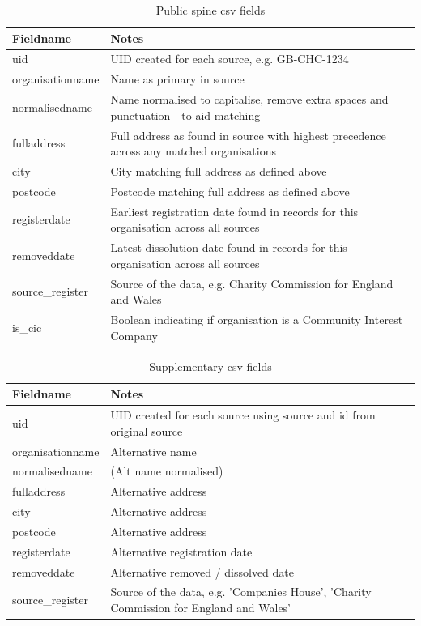 \documentclass{article}
\begin{document}
\begin{table}[h]
  \centering
  \begin{tabularx}{\textwidth}{|l|X|}
    \hline
    Fieldname  &	Notes \\
    \hline \hline
    uid &	UID created for each source, e.g. GB-CHC-1234\\    \hline
    organisationname &	Name as primary in source\\    \hline
    normalisedname &	Name normalised to capitalise, remove extra spaces and punctuation - to aid matching \\    \hline
    fulladdress &	Full address as found in source with highest precedence across any matched organisations\\    \hline
    city &	City matching full address as defined above\\    \hline
    postcode &	Postcode matching full address as defined above\\    \hline
    registerdate &	Earliest registration date found in records for this organisation across all sources\\    \hline
    removeddate &	Latest dissolution date found in records for this organisation across all sources\\    \hline
    source\_register & Source of the data, e.g. Charity Commission for England and Wales \\    \hline
    is\_cic & Boolean indicating if organisation is a Community Interest Company\\    \hline
\end{tabularx}
\caption{Public spine csv fields}
\label{tab:spine_fields}
\end{table}

\begin{table}[h]
  \centering
  \begin{tabularx}{\textwidth}{|l|X|}
    \hline
Fieldname &	Notes \\ \hline \hline
uid &	UID created for each source using source and id from original source \\ \hline
organisationname &	Alternative name \\ \hline
normalisedname &	(Alt name normalised) \\ \hline
fulladdress &	Alternative address \\ 
city &	 Alternative address\\ 
postcode &	Alternative address\\ \hline
registerdate &	 Alternative registration date \\ \hline
removeddate & Alternative removed / dissolved date \\ \hline
source\_register & Source of the data, e.g. 'Companies House', 'Charity Commission for England and Wales' \\    \hline
\end{tabularx}
\caption{Supplementary csv fields}
\label{tab:supplementary_fields}
\end{table}
\end{document}
